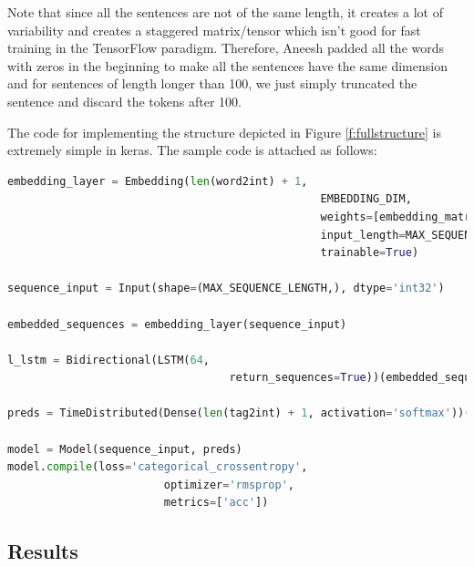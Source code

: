 \documentclass[11pt]{article}
\theoremstyle{plain}
\begin{document}
Note that since all the sentences are not of the same length, it creates a lot 
of variability and creates a staggered matrix/tensor which isn’t good for fast 
training in the TensorFlow paradigm. Therefore, Aneesh padded all the words 
with zeros in the beginning to make all the sentences have the same 
dimension and for sentences of length longer than 100, we just simply 
truncated the sentence and discard the tokens after 100. 

The code for implementing the structure depicted in Figure 
\ref{f:fullstructure} is extremely simple in keras. The sample code is attached 
as follows:

 \begin{lstlisting}[language=Python]
embedding_layer = Embedding(len(word2int) + 1,
												EMBEDDING_DIM,
												weights=[embedding_matrix],
												input_length=MAX_SEQUENCE_LENGTH,
												trainable=True)
												
sequence_input = Input(shape=(MAX_SEQUENCE_LENGTH,), dtype='int32')

embedded_sequences = embedding_layer(sequence_input)

l_lstm = Bidirectional(LSTM(64, 	
								  return_sequences=True))(embedded_sequences)
								  
preds = TimeDistributed(Dense(len(tag2int) + 1, activation='softmax'))(l_lstm)

model = Model(sequence_input, preds)
model.compile(loss='categorical_crossentropy',
						optimizer='rmsprop',
						metrics=['acc'])
\end{lstlisting}


\subsection{Results}
\end{document}
